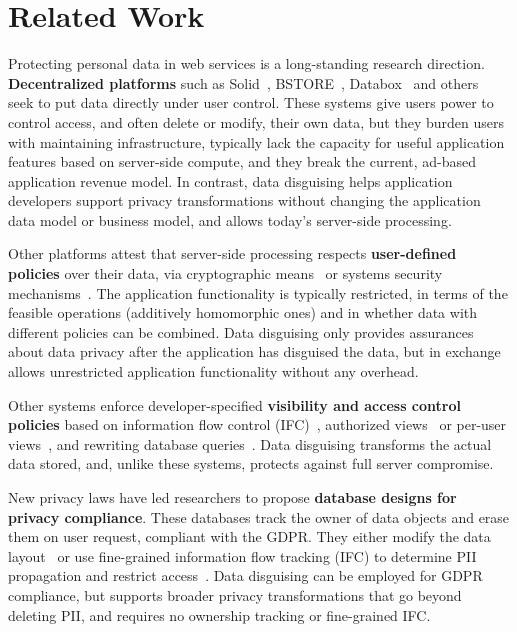 \section{Related Work}
\label{sec:related}

%
Protecting personal data in web services is a long-standing research direction.
%
\textbf{Decentralized platforms} such as Solid~\cite{solid}, BSTORE~\cite{bstore},
Databox~\cite{databox} and others~\cite{diy, amber, oort, w5, blockstack}
seek to put data directly under user control.
%
These systems give users power to control access, and often delete or modify, their
own data, but they burden users with maintaining infrastructure, typically lack the
capacity for useful application features based on server-side compute, and they break
the current, ad-based application revenue model.
%
In contrast, data disguising helps application developers support privacy
transformations without changing the application data model or business model,
and allows today's server-side processing.
%

%
Other platforms attest that server-side processing respects
\textbf{user-defined policies} over their data, via cryptographic means~\cite{zeph}
or systems security mechanisms~\cite{riverbed}.
%
The application functionality is typically restricted, in terms of the feasible
operations (\eg additively homomorphic ones) and in whether data with different policies
can be combined.
%
Data disguising only provides assurances about data privacy after the application has
disguised the data, but in exchange allows unrestricted application functionality
without any overhead.
%

%
Other systems enforce developer-specified \textbf{visibility and access control policies}
based on information flow control (IFC)~\cite{static, jeeves, jif, hails, ifdb},
authorized views~\cite{oracle} or per-user views~\cite{multiverse}, and rewriting database
queries~\cite{qapla, sieve}.
%
Data disguising transforms the actual data stored, and, unlike these systems, protects
against full server compromise.
%


%
New privacy laws have led researchers to propose \textbf{database designs
for privacy compliance}.
%
These databases track the owner of data objects and erase them on user request, compliant
with \eg the GDPR.
%
They either modify the data layout~\cite{usershards} or use fine-grained information flow
tracking (IFC) to determine PII propagation and restrict access~\cite{schengendb}.
%
Data disguising can be employed for GDPR compliance, but supports broader privacy
transformations that go beyond deleting PII, and requires no ownership tracking or
fine-grained IFC.
%

